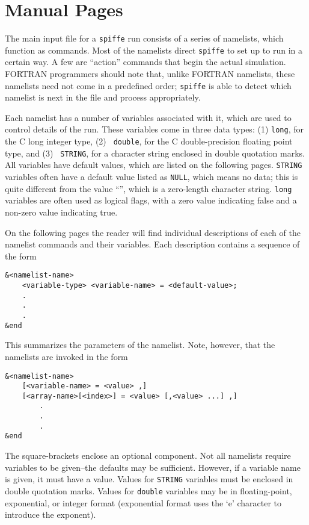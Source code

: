 \documentclass[11pt]{article}
\begin{document}
\section{Manual Pages}

The main input file for a {\tt spiffe} run consists of a series of
namelists, which function as commands.  Most of the namelists direct
{\tt spiffe} to set up to run in a certain way.  A few are ``action''
commands that begin the actual simulation.  FORTRAN programmers should
note that, unlike FORTRAN namelists, these namelists need not come in
a predefined order; {\tt spiffe} is able to detect which namelist is
next in the file and process appropriately.

Each namelist has a number of variables associated with it, which are
used to control details of the run.  These variables come in three
data types: (1) {\tt long}, for the C long integer type, (2) {\tt
double}, for the C double-precision floating point type, and (3) {\tt
STRING}, for a character string enclosed in double quotation marks.
All variables have default values, which are listed on the following
pages.  {\tt STRING} variables often have a default value listed as
{\tt NULL}, which means no data; this is quite different from the
value ``'', which is a zero-length character string.  {\tt long}
variables are often used as logical flags, with a zero value
indicating false and a non-zero value indicating true.

On the following pages the reader will find individual descriptions of
each of the namelist commands and their variables.  Each description
contains a sequence of the form
\begin{verbatim}
&<namelist-name>
    <variable-type> <variable-name> = <default-value>;
    .
    .
    .
&end
\end{verbatim}
This summarizes the parameters of the namelist.  Note, however, that the namelists are invoked in the form
\begin{verbatim}
&<namelist-name>
    [<variable-name> = <value> ,]
    [<array-name>[<index>] = <value> [,<value> ...] ,]
        .
        .
        .
&end
\end{verbatim}  The square-brackets enclose an optional component.  
Not all namelists require variables to be given--the defaults may be
sufficient.  However, if a variable name is given, it must have a
value.  Values for \verb|STRING| variables must be enclosed in double
quotation marks.  Values for \verb|double| variables may be in
floating-point, exponential, or integer format (exponential format
uses the `e' character to introduce the exponent).
\end{document}
